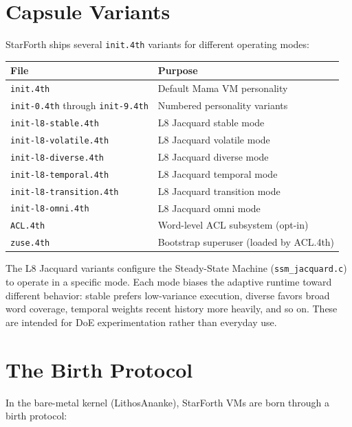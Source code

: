 \section{Capsule Variants}
\label{sec:capsule-variants}

StarForth ships several \texttt{init.4th} variants for different operating
modes:

\begin{center}
\begin{tabular}{ll}
\toprule
File & Purpose \\
\midrule
\texttt{init.4th}          & Default Mama VM personality \\
\texttt{init-0.4th} through \texttt{init-9.4th} & Numbered personality variants \\
\texttt{init-l8-stable.4th}   & L8 Jacquard stable mode \\
\texttt{init-l8-volatile.4th} & L8 Jacquard volatile mode \\
\texttt{init-l8-diverse.4th}  & L8 Jacquard diverse mode \\
\texttt{init-l8-temporal.4th} & L8 Jacquard temporal mode \\
\texttt{init-l8-transition.4th} & L8 Jacquard transition mode \\
\texttt{init-l8-omni.4th}    & L8 Jacquard omni mode \\
\texttt{ACL.4th}             & Word-level ACL subsystem (opt-in) \\
\texttt{zuse.4th}            & Bootstrap superuser (loaded by ACL.4th) \\
\bottomrule
\end{tabular}
\end{center}

The L8 Jacquard variants configure the Steady-State Machine (\texttt{ssm\_jacquard.c})
to operate in a specific mode. Each mode biases the adaptive runtime toward
different behavior: stable prefers low-variance execution, diverse favors
broad word coverage, temporal weights recent history more heavily, and so on.
These are intended for DoE experimentation rather than everyday use.

\section{The Birth Protocol}
\label{sec:birth-protocol}

In the bare-metal kernel (LithosAnanke), StarForth VMs are born through a
birth protocol:

